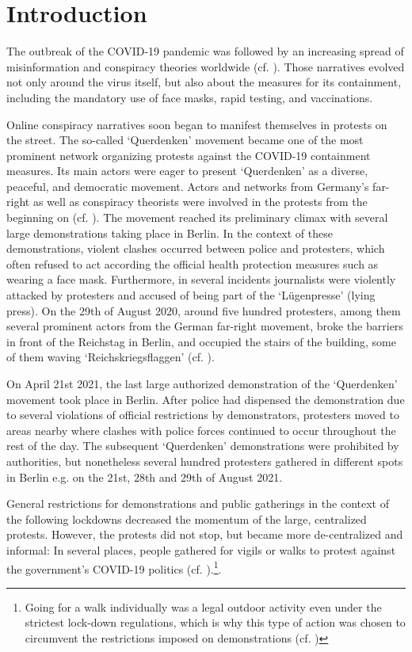 \chapter{Introduction}
\label{cha:introduction}

The outbreak of the COVID-19 pandemic was followed by an increasing spread of misinformation and conspiracy theories worldwide (cf. \cite{fns_study}). Those narratives evolved not only around the virus itself, but also about the measures for its containment, including the mandatory use of face masks, rapid testing, and vaccinations. 

Online conspiracy narratives soon began to manifest themselves in protests on the street. The so-called `Querdenken' movement became one of the most prominent network organizing protests against the COVID-19 containment measures. Its main actors were eager to present `Querdenken' as a diverse, peaceful, and democratic movement. Actors and networks from Germany's far-right as well as conspiracy theorists were involved in the protests from the beginning on (cf. \cite{fgz_2020}).
The movement reached its preliminary climax with several large demonstrations taking place in Berlin. In the context of these demonstrations, violent clashes occurred between police and protesters, which often refused to act according the official health protection measures such as wearing a face mask. Furthermore, in several incidents journalists were violently attacked by protesters and accused of being part of the `Lügenpresse' (lying press). On the 29th of August 2020, around five hundred protesters, among them several prominent actors from the German far-right movement, broke the barriers in front of the Reichstag in Berlin, and occupied the stairs of the building, some of them waving `Reichskriegsflaggen' (cf. \cite{rbb_reichstag}).  

On April 21st 2021, the last large authorized demonstration of the `Querdenken' movement took place in Berlin. After police had dispensed the demonstration due to several violations of official restrictions by demonstrators, protesters moved to areas nearby where clashes with police forces continued to occur throughout the rest of the day. The subsequent `Querdenken' demonstrations were prohibited by authorities, but nonetheless several hundred protesters gathered in different spots in Berlin e.g. on the 21st, 28th and 29th of August 2021. 

General restrictions for demonstrations and public gatherings in the context of the following lockdowns decreased the momentum of the large, centralized protests. However, the protests did not stop, but became more de-centralized and informal: In several places, people gathered for vigils or walks to protest against the government's COVID-19 politics (cf. \cite{cemas_2022}).\footnote{Going for a walk individually was a legal outdoor activity even under the strictest lock-down regulations, which is why this type of action was chosen to circumvent the restrictions imposed on demonstrations (cf. \cite{cemas_2022})}.

